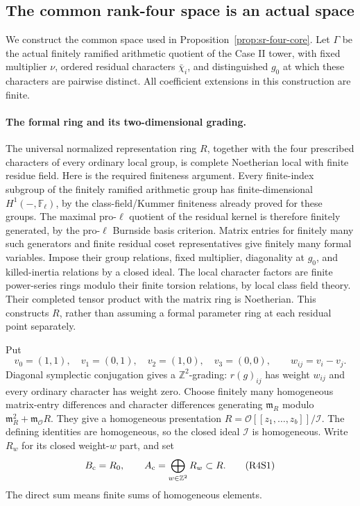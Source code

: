 \subsection{The common rank-four space is an actual space}
\label{subsec:sr-four-common-space-construction}

We construct the common space used in
Proposition~\ref{prop:sr-four-core}.
Let \(\Gamma\) be the actual finitely ramified arithmetic
quotient of the Case II tower, with fixed multiplier \(\nu\),
ordered residual characters \(\bar\chi_i\), and distinguished
\(g_0\) at which these characters are pairwise distinct.
All coefficient extensions in this construction are finite.

\paragraph{The formal ring and its two-dimensional grading.}
The universal normalized representation ring \(R\), together
with the four prescribed characters of every ordinary local
group, is complete Noetherian local with finite residue field.
Here is the required finiteness argument.
Every finite-index subgroup of the finitely ramified arithmetic
group has finite-dimensional \(H^1(-,\mathbb F_\ell)\), by the
class-field/Kummer finiteness already proved for these groups.
The maximal pro-\(\ell\) quotient of the residual kernel is
therefore finitely generated, by the pro-\(\ell\) Burnside basis
criterion. Matrix entries for finitely many such generators
and finite residual coset representatives give finitely many
formal variables. Impose their group relations, fixed multiplier,
diagonality at \(g_0\), and killed-inertia relations by a closed
ideal. The local character factors are finite power-series
rings modulo their finite torsion relations, by local class
field theory. Their completed tensor product with the matrix
ring is Noetherian. This constructs \(R\), rather than assuming
a formal parameter ring at each residual point separately.

Put
\[
 v_0=(1,1),\quad v_1=(0,1),\quad
 v_2=(1,0),\quad v_3=(0,0),\qquad w_{ij}=v_i-v_j.
\]
Diagonal symplectic conjugation gives a
\(\mathbb Z^2\)-grading: \(r(g)_{ij}\) has weight \(w_{ij}\)
and every ordinary character has weight zero.
Choose finitely many homogeneous matrix-entry differences and
character differences generating \(\mathfrak m_R\) modulo
\(\mathfrak m_R^2+\mathfrak m_{\mathcal O}R\).
They give a homogeneous presentation
\(R=\mathcal O[[z_1,\ldots,z_b]]/\mathcal I\).
The defining identities are homogeneous, so the closed ideal
\(\mathcal I\) is homogeneous.
Write \(R_w\) for its closed weight-\(w\) part, and set
\[
                 B_{\rm c}=R_0,\qquad
                 A_{\rm c}=\bigoplus_{w\in\mathbb Z^2}R_w
                                      \subset R.          \tag{R4S1}
\]
The direct sum means finite sums of homogeneous elements.

